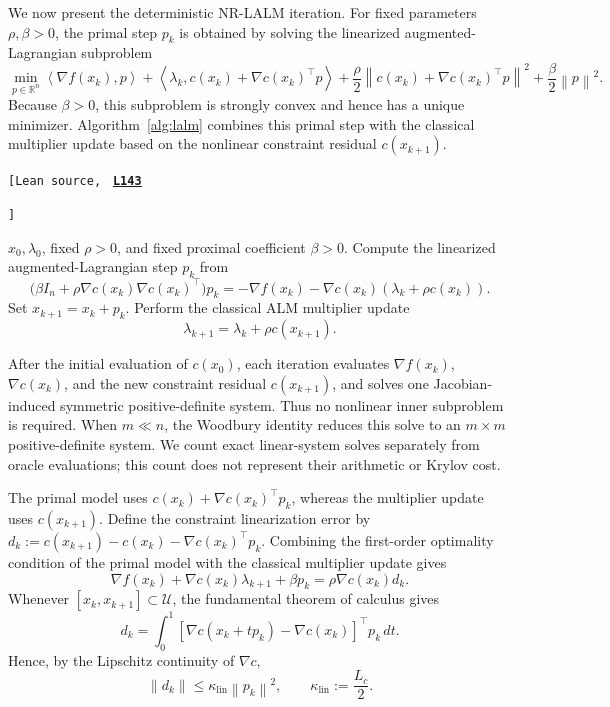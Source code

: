 \documentclass[11pt]{article}
\theoremstyle{definition}
\theoremstyle{remark}
\numberwithin{equation}{section}
\numberwithin{figure}{section}
\numberwithin{table}{section}
\numberwithin{algorithm}{section}
\newcommand{\norm}[1]{\left\lVert #1\right\rVert}
\newcommand{\ip}[2]{\left\langle #1,#2\right\rangle}
\newcommand{\grad}{\nabla}
\newcommand{\leanLinkText}[1]{%
  \underline{\textbf{#1}}%
}
\newcommand{\leanDeclTag}[2]{%
  {\footnotesize\texttt{[Lean source, }}%
  \href{https://github.com/optpku/ReasBook/blob/v4.32.2/ReasBook/Papers/TR_LALM_theory/#1?plain=1\#L#2}%
    {\leanLinkText{\footnotesize\texttt{L#2}}}%
}
\newcommand{\leanDeclTagEnd}{%
  \unskip
  {\footnotesize\texttt{]}}\enspace
}
\begin{document}
We now present the deterministic NR-LALM iteration.  For fixed parameters $\rho,\beta>0$, the primal step $p_k$ is obtained by solving the linearized augmented-Lagrangian subproblem
$$
\min_{p\in\mathbb{R}^n} \ip{\grad f(x_k)}{p}
 +\ip{\lambda_k}{c(x_k) +\grad c(x_k)^\top p}
 +\frac{\rho}{2}\norm{c(x_k) +\grad c(x_k)^\top p}^2
 +\frac{\beta}{2}\norm{p}^2.
$$
Because $\beta>0$, this subproblem is strongly convex and hence has a unique minimizer.  Algorithm~\ref{alg:lalm} combines this primal step with the classical multiplier update based on the nonlinear constraint residual
$c(x_{k+1})$.
\begin{algorithm}[H]
\caption{Fixed-penalty NR-LALM}
\label{alg:lalm}
\leanDeclTag{Algorithm_2_1/Iteration.lean}{143}
\leanDeclTagEnd
\begin{algorithmic}[1]
\Require $x_0,\lambda_0$, fixed $\rho>0$, and fixed proximal coefficient $\beta>0$.
    \State Compute the linearized augmented-Lagrangian step $p_k$ from
    \begin{equation*}
        \big(\beta I_n+\rho\grad c(x_k)\grad c(x_k)^\top\big)p_k
        =-\grad f(x_k)-\grad c(x_k)(\lambda_k+\rho c(x_{k})).
    \end{equation*}
    \State Set $x_{k+1}=x_k+p_k$.
    \State Perform the classical ALM multiplier update
    \begin{equation*}
        \lambda_{k+1}=\lambda_k+\rho c(x_{k+1}).
    \end{equation*}
\EndFor
\end{algorithmic}
\end{algorithm}

After the initial evaluation of $c(x_0)$, each iteration evaluates
$\grad f(x_k)$, $\grad c(x_k)$, and the new constraint residual
$c(x_{k+1})$, and solves one Jacobian-induced symmetric positive-definite system.  Thus no nonlinear inner subproblem is required.  When $m\ll n$, the Woodbury identity reduces this solve to an $m\times m$ positive-definite system.  We count exact linear-system solves separately from oracle evaluations; this count does not represent their arithmetic or Krylov cost.

The primal model uses \(c(x_k)+\grad c(x_k)^\top p_k\), whereas the
multiplier update uses \(c(x_{k+1})\).  Define the constraint linearization error by \(d_k:=c(x_{k+1})-c(x_k)-\grad c(x_k)^\top p_k\). Combining the first-order optimality condition of the primal model with the classical multiplier update gives
\begin{equation}
\grad f(x_k) +\grad c(x_k)\lambda_{k+1} +\beta p_k = \rho\grad c(x_k)d_k.
\label{eq:identity}
\end{equation}
Whenever \([x_k,x_{k+1}]\subset\mathcal U\), the fundamental theorem of calculus gives
$$
d_k = \int_0^1 \left[ \grad c(x_k+t p_k)-\grad c(x_k) \right]^\top p_k\,dt.
$$
Hence, by the Lipschitz continuity of \(\grad c\),
\begin{equation}
    \norm{d_k}
    \le
    \kappa_{\mathrm{lin}}\norm{p_k}^2,
    \qquad
    \kappa_{\mathrm{lin}}
    :=
    \frac{L_c}{2}.
    \label{eq:linerrorbounds}
\end{equation}
\end{document}
